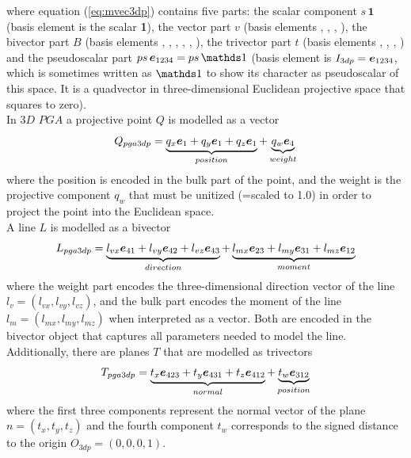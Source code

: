 where equation (\ref{eq:mvec3dp}) contains five parts: the scalar component $s \, \bm{1}$
(basis element is the scalar \textbf{1}), the vector part $v$ (basis elements ,
, , ), the bivector part $B$ (basis elements , , ,
, , ), the trivector part $t$ (basis elements , ,
, ) and the pseudoscalar part $ps \, \bv{1234} = ps \, \ps$
(basis element is $I_{3dp} = \bm{e}_{1234}$, which is sometimes written as $\ps$ to
show its character as pseudoscalar of this space. It is a quadvector in three-dimensional
Euclidean projective space that squares to zero). \\

In $3D$ $PGA$ a projective point $Q$ is modelled as a vector
\begin{equation}
    Q_{pga3dp} = \underbrace{q_x \bm{e}_{1} + q_y \bm{e}_{1} + q_z \bm{e}_{1}}_{position} +
                 \underbrace{q_w \bm{e}_{4}}_{weight}
\end{equation}
where the position is encoded in the bulk part of the point, and the weight is the
projective component $q_w$ that must be unitized (=scaled to 1.0) in order to project the
point into the Euclidean space. \\

A line $L$ is modelled as a bivector
\begin{equation}
    L_{pga3dp} = \underbrace{l_{vx} \bm{e}_{41} + l_{vy} \bm{e}_{42} + l_{vz} \bm{e}_{43}}_{direction}
                 +
                 \underbrace{l_{mx} \bm{e}_{23} + l_{my} \bm{e}_{31} + l_{mz} \bm{e}_{12}}_{moment}
\end{equation}
where the weight part encodes the three-dimensional direction vector of the line $l_v =
(l_{vx},l_{vy},l_{vz})$, and the bulk part encodes the moment of the line $l_m =
(l_{mx},l_{my},l_{mz})$ when interpreted as a vector. Both are encoded in the bivector
object that captures all parameters needed to model the line. \\

Additionally, there are planes $T$ that are modelled as trivectors
\begin{equation}
    T_{pga3dp} = \underbrace{t_x \bm{e}_{423} + t_y \bm{e}_{431} + t_z \bm{e}_{412}}_{normal} +
                 \underbrace{t_w \bm{e}_{312}}_{position}
                 \label{eq:plane_def_pga3dp}
\end{equation}
where the first three components represent the normal vector of the plane $n = (t_x, t_y,
t_z)$ and the fourth component $t_w$ corresponds to the signed distance to the origin
$O_{3dp} = (0,0,0,1)$. \\


